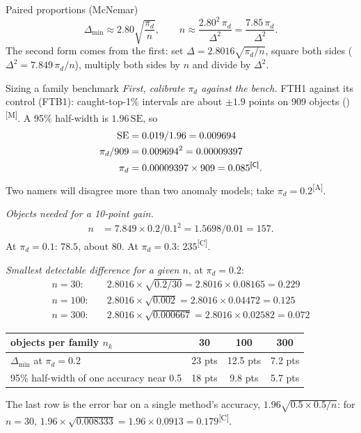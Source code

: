 \documentclass[11pt,a4paper,oneside,openany]{book}
\newcommand{\meas}{\textsuperscript{\textsf{\scriptsize[M]}}}
\newcommand{\comp}{\textsuperscript{\textsf{\scriptsize[C]}}}
\newcommand{\assm}{\textsuperscript{\textsf{\scriptsize[A]}}}
\begin{document}
\begin{rulebox}[label=rule:mde]{Paired proportions (McNemar)}
\[
  \Delta_{\min}\approx2.80\sqrt{\frac{\pi_d}{n}},\qquad n\approx\frac{2.80^2\,\pi_d}{\Delta^2}=\frac{7.85\,\pi_d}{\Delta^2}.
\]
The second form comes from the first: set $\Delta=2.8016\sqrt{\pi_d/n}$, square both sides ($\Delta^2=7.849\,\pi_d/n$), multiply both sides by $n$ and divide by $\Delta^2$.
\end{rulebox}

\begin{worked}[label=we:mde]{Sizing a family benchmark}
\emph{First, calibrate $\pi_d$ against the bench.} FTH1 against its control (FTB1): caught-top-1\% intervals are about $\pm1.9$ points on 909 objects
()\meas. A 95\% half-width is $1.96\,\mathrm{SE}$, so
\begin{align*}
\mathrm{SE} &= 0.019/1.96=0.009694\\
\pi_d/909 &= 0.009694^2=0.00009397\\
\pi_d &= 0.00009397\times909=0.085\comp .
\end{align*}
Two namers will disagree more than two anomaly models; take $\pi_d=0.2$\assm.

\emph{Objects needed for a 10-point gain.}
\begin{align*}
n &= 7.849\times0.2/0.1^2=1.5698/0.01=157 .
\end{align*}
At $\pi_d=0.1$: $78.5$, about 80. At $\pi_d=0.3$: $235$\comp.

\emph{Smallest detectable difference for a given $n$}, at $\pi_d=0.2$:
\begin{align*}
n=30: &\quad 2.8016\times\sqrt{0.2/30}=2.8016\times0.08165=0.229\\
n=100: &\quad 2.8016\times\sqrt{0.002}=2.8016\times0.04472=0.125\\
n=300: &\quad 2.8016\times\sqrt{0.000667}=2.8016\times0.02582=0.072
\end{align*}
\end{worked}

\begin{center}\small
\begin{tabular}{@{}lccc@{}}
\toprule
objects per family $n_k$ & 30 & 100 & 300\\
\midrule
$\Delta_{\min}$ at $\pi_d=0.2$ & 23 pts & 12.5 pts & 7.2 pts\\
95\% half-width of one accuracy near 0.5 & 18 pts & 9.8 pts & 5.7 pts\\
\bottomrule
\end{tabular}
\end{center}
The last row is the error bar on a single method's accuracy, $1.96\sqrt{0.5\times0.5/n}$: for $n=30$, $1.96\times\sqrt{0.008333}=1.96\times0.0913=0.179$\comp.
\end{document}
